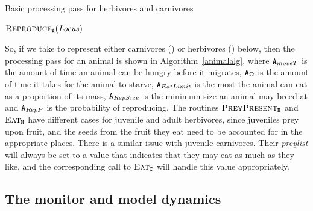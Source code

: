 \begin{algorithm}\label{animalalg}
  \caption{Basic processing pass for herbivores and carnivores}
  \begin{algorithmic}
  \State \Die
  \EndIf
  \Else
  $\text{\textsc{Reproduce}}_{\mathtt{A}}(\mathit{Locus})$
  \EndIf
  \EndIf
\end{algorithmic}
\end{algorithm}

So, if we take  to represent either carnivores () or
herbivores () below, then the processing pass for an animal is
shown in Algorithm~\ref{animalalg}, where $\texttt{A}_{moveT}$ is the
amount of time an animal can be hungry before it migrates,
$\texttt{A}_\Omega$ is the amount of time it takes for the animal to
starve, $\texttt{A}_{EatLimit}$ is the most the animal can eat as a
proportion of its mass, $\texttt{A}_{RepSize}$ is the minimum size an
animal may breed at and $\texttt{A}_{RepP}$ is the probability of
reproducing. The routines $\text{\textsc{PreyPresent}}_{\mathtt{H}}$ and
$\text{\textsc{Eat}}_{\mathtt{H}}$ have different cases for juvenile and adult
herbivores, since juveniles prey upon fruit, and the seeds from the
fruit they eat need to be accounted for in the appropriate places. There is
a similar issue with juvenile carnivores. Their \emph{preylist} will
always be set to a value that indicates that they may eat as much as
they like, and the corresponding call to $\text{\textsc{Eat}}_{\mathtt{C}}$ will
handle this value appropriately.


\subsection{The monitor and model dynamics}
\newcommand{\cst}[1]{\node{\bar{\check{\tau}}}^\Sigma_{#1}} %
\newcommand{\domt}[1]{\node{\check{\tau}}^\Sigma_{#1}} %



